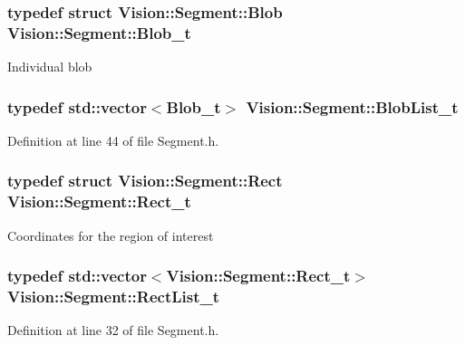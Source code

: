 \subsubsection[{Blob\+\_\+t}]{\setlength{\rightskip}{0pt plus 5cm}typedef struct {\bf Vision\+::\+Segment\+::\+Blob}  {\bf Vision\+::\+Segment\+::\+Blob\+\_\+t}}\label{class_vision_1_1_segment_add6c81230e499b159218c5232e3b76ae}
Individual blob \hypertarget{class_vision_1_1_segment_a60e08251e2ab94239e245044c31cde51}{}
\subsubsection[{Blob\+List\+\_\+t}]{\setlength{\rightskip}{0pt plus 5cm}typedef std\+::vector$<${\bf Blob\+\_\+t}$>$ {\bf Vision\+::\+Segment\+::\+Blob\+List\+\_\+t}}\label{class_vision_1_1_segment_a60e08251e2ab94239e245044c31cde51}


Definition at line 44 of file Segment.\+h.

\hypertarget{class_vision_1_1_segment_af9428422a82edaab8a1e5ba59acc8c16}{}
\subsubsection[{Rect\+\_\+t}]{\setlength{\rightskip}{0pt plus 5cm}typedef struct {\bf Vision\+::\+Segment\+::\+Rect}  {\bf Vision\+::\+Segment\+::\+Rect\+\_\+t}}\label{class_vision_1_1_segment_af9428422a82edaab8a1e5ba59acc8c16}
Coordinates for the region of interest \hypertarget{class_vision_1_1_segment_aaaa7a3b37f6fa4402bc1309e9bf74bec}{}
\subsubsection[{Rect\+List\+\_\+t}]{\setlength{\rightskip}{0pt plus 5cm}typedef std\+::vector$<${\bf Vision\+::\+Segment\+::\+Rect\+\_\+t}$>$ {\bf Vision\+::\+Segment\+::\+Rect\+List\+\_\+t}}\label{class_vision_1_1_segment_aaaa7a3b37f6fa4402bc1309e9bf74bec}


Definition at line 32 of file Segment.\+h.




